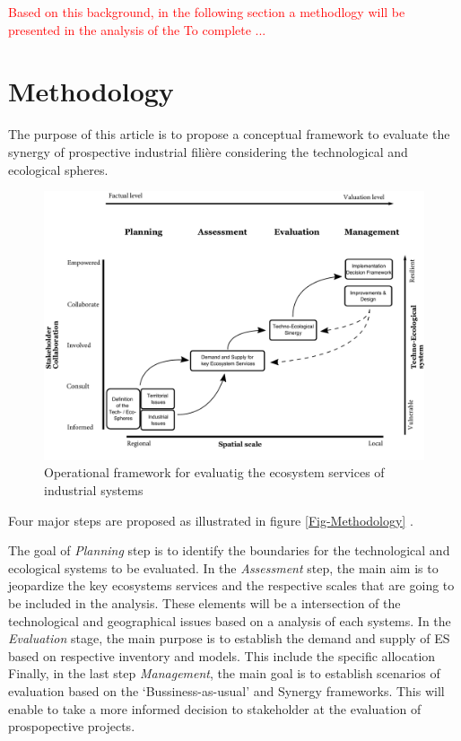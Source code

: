 \documentclass[
  14pt,
]{extarticle}
\begin{document}
\textcolor{red}{
Based on this background, in the following section a methodlogy will be presented in the analysis of the  To complete ...}

\hypertarget{methodology}{%
\section{Methodology}\label{methodology}}

The purpose of this article is to propose a conceptual framework to evaluate the synergy of prospective industrial filière considering the technological and ecological spheres.

\begin{figure}[!ht]

{\centering \includegraphics[width=1\linewidth]{Figures/Methodology} 

}

\caption{Operational framework for evaluatig the ecosystem services of industrial systems}\label{fig:Fig-Methodology}
\end{figure}

Four major steps are proposed as illustrated in figure \ref{Fig-Methodology} .

The goal of \emph{Planning} step is to identify the boundaries for the technological and ecological systems to be evaluated.
In the \emph{Assessment} step, the main aim is to jeopardize the key ecosystems services and the respective scales that are going to be included in the analysis.
These elements will be a intersection of the technological and geographical issues based on a analysis of each systems.
In the \emph{Evaluation} stage, the main purpose is to establish the demand and supply of ES based on respective inventory and models. This include the specific allocation
Finally, in the last step \emph{Management}, the main goal is to establish scenarios of evaluation based on the `Bussiness-as-usual' and Synergy frameworks.
This will enable to take a more informed decision to stakeholder at the evaluation of prospopective projects.
\end{document}
